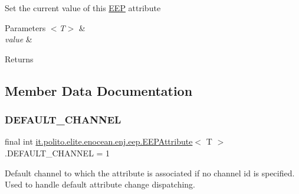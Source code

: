 Set the current value of this \hyperlink{classit_1_1polito_1_1elite_1_1enocean_1_1enj_1_1eep_1_1_e_e_p}{E\+EP} attribute


\begin{DoxyParams}{Parameters}
{\em $<$\+T$>$} & \\
\hline
{\em value} & \\
\hline
\end{DoxyParams}
\begin{DoxyReturn}{Returns}

\end{DoxyReturn}


\subsection{Member Data Documentation}
\hypertarget{classit_1_1polito_1_1elite_1_1enocean_1_1enj_1_1eep_1_1_e_e_p_attribute_a309e82ccacbf9b1618041ff8ee8eea41}{}\label{classit_1_1polito_1_1elite_1_1enocean_1_1enj_1_1eep_1_1_e_e_p_attribute_a309e82ccacbf9b1618041ff8ee8eea41} 
\subsubsection{\texorpdfstring{D\+E\+F\+A\+U\+L\+T\+\_\+\+C\+H\+A\+N\+N\+EL}{DEFAULT\_CHANNEL}}
{\footnotesize\ttfamily final int \hyperlink{classit_1_1polito_1_1elite_1_1enocean_1_1enj_1_1eep_1_1_e_e_p_attribute}{it.\+polito.\+elite.\+enocean.\+enj.\+eep.\+E\+E\+P\+Attribute}$<$ T $>$.D\+E\+F\+A\+U\+L\+T\+\_\+\+C\+H\+A\+N\+N\+EL = 1\hspace{0.3cm}{\ttfamily [static]}}

Default channel to which the attribute is associated if no channel id is specified. Used to handle default attribute change dispatching. \hypertarget{classit_1_1polito_1_1elite_1_1enocean_1_1enj_1_1eep_1_1_e_e_p_attribute_a1027c0dda631c419cfecf58a8790f61c}{}\label{classit_1_1polito_1_1elite_1_1enocean_1_1enj_1_1eep_1_1_e_e_p_attribute_a1027c0dda631c419cfecf58a8790f61c} 
